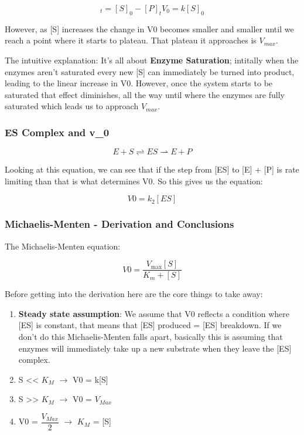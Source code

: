 \documentclass[../main.tex]{subfiles}
\begin{document}
\begin{equation}
	[S]_t = [S]_0 - [P]_t
	V_0 = k [S]_0
\end{equation}

However, as [S] increases the change in V0 becomes smaller and smaller until we reach a point where it starts to plateau. That plateau it approaches is $V_{max}$.

The intuitive explanation: It's all about \textbf{\gls{Enzyme Saturation}}; intitally when the enzymes aren't saturated every new [S] can immediately be turned into product, leading to the linear increase in V0. However, once the system starts to be saturated that effect diminishes, all the way until where the enzymes are fully saturated which leads us to approach $V_{max}$.

\subsubsection{ES Complex and \gls{v_0}}

\begin{equation}
	E + S \rightleftharpoons ES \rightharpoonup E + P
\end{equation}

Looking at this equation, we can see that if the step from [ES] to [E] + [P] is rate limiting than that is what determines V0. So this gives us the equation:

\begin{equation}
	V0 = k_{2}[ES]
\end{equation}

\subsubsection{\gls{Michaelis-Menten} - Derivation and Conclusions}

The Michaelis-Menten equation:

\begin{equation*}
V0 = \frac{V_{\max} [S]}{K_m + [S]}
\end{equation*}


Before getting into the derivation here are the core things to take away:

\begin{enumerate}
	\item \textbf{Steady state assumption}: We assume that V0 reflects a condition where [ES] is constant, that means that [ES] produced = [ES] breakdown. If we don't do this Michaelis-Menten falls apart, basically this is assuming that enzymes will immediately take up a new substrate when they leave the [ES] complex.
	\item S << $K_{M}$ $\rightarrow$ V0 = k[S]
	\item S >> $K_{M}$ $\rightarrow$ V0 = $V_{Max}$
	\item V0 = $\dfrac{V_{Max}}{2}$ $\rightarrow$ $K_{M}$ = [S]
\end{enumerate}
\end{document}
